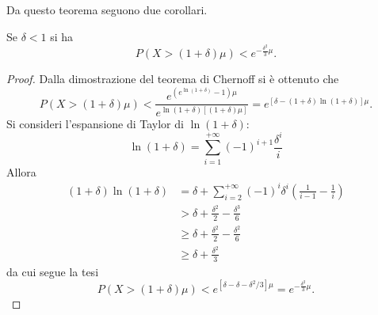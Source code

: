 Da questo teorema seguono due corollari.

\begin{corollario}
\label{corollario:1chernoff}
Se $\delta < 1$ si ha
\[
P(X>(1+\delta)\mu) < e^{-\frac{\delta^2}{3}\mu}.
\]
\end{corollario}
\begin{proof}
Dalla dimostrazione del teorema di Chernoff si è ottenuto che
\[
P(X>(1+\delta)\mu) < \frac{e^{(e^{\ln(1+\delta)}-1)\mu}}{e^{\ln(1+\delta)[(1+\delta)\mu]}} = e^{[\delta - (1+\delta)\ln(1+\delta)]\mu}.
\]
Si consideri l'espansione di Taylor di $\ln(1+\delta)$:
\[
\ln(1+\delta)=\sum_{i=1}^{+\infty}(-1)^{i+1}\frac{\delta^i}{i}
\]
Allora
\begin{align*}
(1+\delta)\ln(1+\delta)&=\delta + \sum_{i=2}^{+\infty}(-1)^i\delta^i\left(\frac{1}{i-1}-\frac{1}{i}\right) \\
&> \delta +\frac{\delta^2}{2}-\frac{\delta^3}{6} \\
&\geq \delta + \frac{\delta^2}{2} -\frac{\delta^2}{6} \\
&\geq \delta + \frac{\delta^2}{3}
\end{align*}
da cui segue la tesi
\[
P(X>(1+\delta)\mu) < e^{[\delta - \delta - \delta^2/3]\mu} = e^{-\frac{\delta^2}{3}\mu}.
\]
\end{proof}

